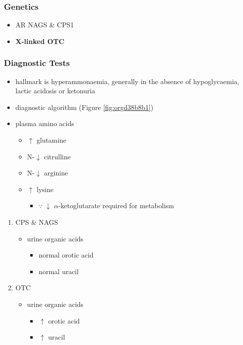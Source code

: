 \documentclass[12pt]{scrartcl}
\begin{document}
\begin{center}
\begin{center}
\subsubsection{Genetics}
\label{sec:org369be22}
\begin{itemize}
\item AR NAGS \& CPS1
\item \textbf{X-linked OTC}
\end{itemize}

\subsubsection{Diagnostic Tests}
\label{sec:orgda1bef1}
\begin{itemize}
\item hallmark is hyperammonaemia, generally in the absence of
hypoglycaemia, lactic acidosis or ketonuria
\item diagnostic algorithm (Figure \ref{fig:orgd38b8b1})
\item plasma amino acids
\begin{itemize}
\item \(\uparrow\) glutamine
\item N-\(\downarrow\) citrulline
\item N-\(\downarrow\) arginine
\item \(\uparrow\) lysine
\begin{itemize}
\item \(\because\) \(\downarrow\) \(\alpha\)-ketoglutarate required for metabolism
\end{itemize}
\end{itemize}
\end{itemize}
\begin{enumerate}
\item CPS \& NAGS
\label{sec:org35b0b44}
\begin{itemize}
\item urine organic acids
\begin{itemize}
\item normal orotic acid
\item normal uracil
\end{itemize}
\end{itemize}
\item OTC
\label{sec:org1963b20}
\begin{itemize}
\item urine organic acids
\begin{itemize}
\item \(\uparrow\) orotic acid
\item \(\uparrow\) uracil
\end{itemize}
\end{itemize}
\end{enumerate}


\end{center}
\end{center}
\end{document}
